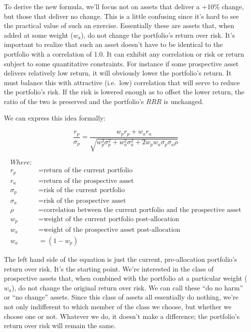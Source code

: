 \documentclass[]{article}
\begin{document}
To derive the new formula, we'll focus not on assets that deliver a
+10\% change, but those that deliver no change. This is a little
confusing since it's hard to see the practical value of such an
exercise. Essentially these are assets that, when added at some weight
(\(w_a\)), do not change the portfolio's return over risk. It's
important to realize that such an asset doesn't have to be identical to
the portfolio with a correlation of 1.0. It can exhibit any correlation
or risk or return subject to some quantitative constraints. For instance
if some prospective asset delivers relatively low return, it will
obviously lower the portfolio's return. It must balance this with
attractive (i.e.~low) correlation that will serve to reduce the
portfolio's risk. If the risk is lowered enough as to offset the lower
return, the ratio of the two is preserved and the portfolio's \(RRR\) is
unchanged.

We can express this idea formally:

\[
\frac{r_p}{\sigma_p} = \frac{w_p r_p + w_a r_a}
{\sqrt{w_p^2 \sigma_p^2 + w_a^2 \sigma_a^2 + 2 w_p w_a \sigma_p \sigma_a \rho}}
\]

\[
\begin{aligned}
Where: & \\
r_p & = \text{return of the current portfolio} \\
r_a & = \text{return of the prospective asset} \\
\sigma_p & = \text{risk of the current portfolio} \\
\sigma_a & = \text{risk of the prospective asset} \\
\rho & = \text{correlation between the current portfolio and the prospective asset} \\
w_p & = \text{weight of the current portfolio post-allocation} \\
w_a & = \text{weight of the prospective asset post-allocation} \\
w_a & = (1 - w_p)
\end{aligned}
\]

The left hand side of the equation is just the current, pre-allocation
portfolio's return over risk. It's the starting point. We're interested
in the class of prospective assets that, when combined with the
portfolio at a particular weight (\(w_a\)), do not change the original
return over risk. We can call these ``do no harm'' or ``no change''
assets. Since this class of assets all essentially do nothing, we're not
only indifferent to which member of the class we choose, but whether we
choose one or not. Whatever we do, it doesn't make a difference; the
portfolio's return over risk will remain the same.
\end{document}
